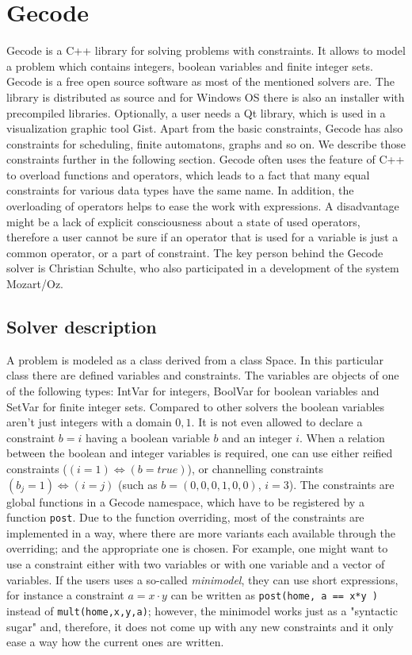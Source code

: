 \section{Gecode}

Gecode is a C++ library for solving problems with constraints. It allows to
model a problem which contains integers, boolean variables and finite integer sets. Gecode
is a free open source software as most of the mentioned solvers are. The library is
distributed as source and for Windows OS there is also an installer with
precompiled libraries. Optionally, a user needs a Qt library, which is used in 
a visualization graphic tool Gist. Apart from the basic constraints, Gecode has also 
constraints for scheduling, finite automatons, graphs and so on. We describe those
constraints further in the following section. Gecode often uses the feature of C++
to overload functions and operators, which leads to a fact that many equal constraints for
various data types have the same name. In addition, the overloading of operators
helps to ease the work with expressions. A disadvantage might be a lack of explicit consciousness
about a state of used operators, therefore a user cannot be sure if an operator that is used 
for a variable is just a common operator, or a part of constraint. The key person behind the Gecode 
solver is Christian Schulte, who also participated in a development of the system Mozart/Oz. 

\subsection{Solver description}
A problem is modeled as a class derived from a class Space. In this particular class
there are defined variables and constraints. The variables are objects of one of the following types:
IntVar for integers, BoolVar for boolean variables and SetVar for finite integer sets. 
Compared to other solvers the boolean variables aren't just integers with a domain ${0,1}$.
It is not even allowed to declare a constraint $b=i$ having a boolean variable $b$ and an integer $i$.
When a relation between the boolean and integer variables is required, one can use either reified constraints
($(i = 1) \Leftrightarrow (b = true)$), or channelling constraints $(b_j = 1) \Leftrightarrow (i = j)$ (such as $b = (0,0,0,1,0,0)$, $i = 3$).
The constraints are global functions in a Gecode namespace, which have to be registered by a function \texttt{post}.
Due to the function overriding, most of the constraints are implemented in a way, 
where there are more variants each available through the overriding; and the appropriate one is chosen.
For example, one might want to use a constraint either with two variables or with one variable and 
a vector of variables. If the users uses a so-called {\em minimodel}, they can use short expressions,
for instance a constraint $a = x \cdot y$ can be written as \texttt{post(home, a == x*y )} instead of \texttt{mult(home,x,y,a)}; 
however, the minimodel works just as a "syntactic sugar" and, therefore, it does not come up 
with any new constraints and it only ease a way how the current ones are written. 

